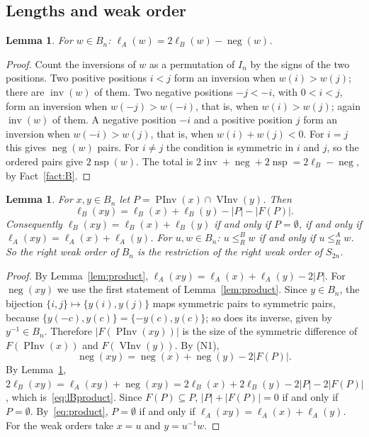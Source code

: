 \documentclass[11pt]{amsart}
\newtheorem{lemma}[theorem]{Lemma}
\theoremstyle{definition}
\theoremstyle{remark}
\numberwithin{equation}{section}
\newcommand{\leR}{\le_R}
\newcommand{\abs}[1]{\lvert #1\rvert}
\DeclareMathOperator{\PInv}{PInv}
\DeclareMathOperator{\VInv}{VInv}
\DeclareMathOperator{\invB}{inv}
\DeclareMathOperator{\negB}{neg}
\DeclareMathOperator{\nspB}{nsp}
\begin{document}
\subsection{Lengths and weak order}

\begin{lemma}\label{lem:lAlB}
For \(w\in B_n\): \(\ell_A(w)=2\ell_B(w)-\negB(w)\).
\end{lemma}

\begin{proof}
Count the inversions of \(w\) as a permutation of \(I_n\) by the signs of the two positions. Two positive positions \(i<j\) form an inversion when \(w(i)>w(j)\); there are \(\invB(w)\) of them. Two negative positions \(-j<-i\), with \(0<i<j\), form an inversion when \(w(-j)>w(-i)\), that is, when \(w(i)>w(j)\); again \(\invB(w)\) of them. A negative position \(-i\) and a positive position \(j\) form an inversion when \(w(-i)>w(j)\), that is, when \(w(i)+w(j)<0\). For \(i=j\) this gives \(\negB(w)\) pairs. For \(i\neq j\) the condition is symmetric in \(i\) and \(j\), so the ordered pairs give \(2\nspB(w)\). The total is \(2\invB+\negB+2\nspB=2\ell_B-\negB\), by Fact~\ref{fact:B}.
\end{proof}

\begin{lemma}\label{lem:Bweak}
For \(x,y\in B_n\) let \(P=\PInv(x)\cap\VInv(y)\). Then
\begin{equation}\label{eq:lBproduct}
\ell_B(xy)=\ell_B(x)+\ell_B(y)-\abs{P}-\abs{F(P)}.
\end{equation}
Consequently \(\ell_B(xy)=\ell_B(x)+\ell_B(y)\) if and only if \(P=\emptyset\), if and only if \(\ell_A(xy)=\ell_A(x)+\ell_A(y)\). For \(u,w\in B_n\): \(u\leR^B w\) if and only if \(u\leR^A w\). So the right weak order of \(B_n\) is the restriction of the right weak order of \(S_{2n}\).
\end{lemma}

\begin{proof}
By Lemma~\ref{lem:product}, \(\ell_A(xy)=\ell_A(x)+\ell_A(y)-2\abs{P}\). For \(\negB(xy)\) we use the first statement of Lemma~\ref{lem:product}. Since \(y\in B_n\), the bijection \(\{i,j\}\mapsto\{y(i),y(j)\}\) maps symmetric pairs to symmetric pairs, because \(\{y(-c),y(c)\}=\{-y(c),y(c)\}\); so does its inverse, given by \(y^{-1}\in B_n\). Therefore \(\abs{F(\PInv(xy))}\) is the size of the symmetric difference of \(F(\PInv(x))\) and \(F(\VInv(y))\). By (N1),
\[
\negB(xy)=\negB(x)+\negB(y)-2\abs{F(P)}.
\]
By Lemma~\ref{lem:lAlB}, \(2\ell_B(xy)=\ell_A(xy)+\negB(xy)=2\ell_B(x)+2\ell_B(y)-2\abs{P}-2\abs{F(P)}\), which is~\eqref{eq:lBproduct}. Since \(F(P)\subseteq P\), \(\abs{P}+\abs{F(P)}=0\) if and only if \(P=\emptyset\). By~\eqref{eq:product}, \(P=\emptyset\) if and only if \(\ell_A(xy)=\ell_A(x)+\ell_A(y)\). For the weak orders take \(x=u\) and \(y=u^{-1}w\).
\end{proof}
\end{document}
